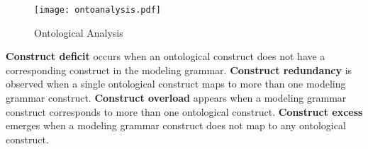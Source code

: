 \begin{figure}[b]
  \centering
  \caption{Ontological Analysis~\cite[p.92]{Weber1997}}
  \label{fig:ontoanalysis}
  \texttt{[image: ontoanalysis.pdf]}
\end{figure}

\textbf{Construct deficit} occurs when an ontological construct does not have a corresponding construct in the modeling grammar. \textbf{Construct redundancy} is observed when a single ontological construct maps to more than one modeling grammar construct. \textbf{Construct overload} appears when a modeling grammar construct corresponds to more than one ontological construct. \textbf{Construct excess} emerges when a modeling grammar construct does not map to any ontological construct.~\cite{moody2009physics}

